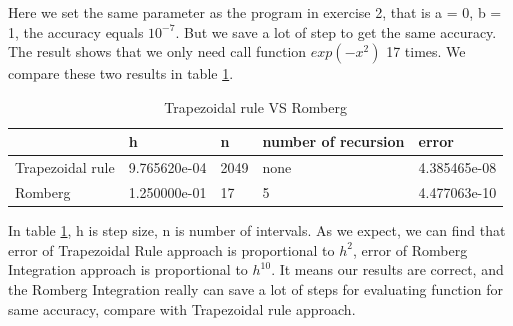 \documentclass{article}
\begin{document}
Here we set the same parameter as the program in exercise 2, that is a = 0, b = 1, the accuracy equals $10^{-7}$. But we save a lot of step to get the same accuracy. The result shows that we only need call function $exp(-x^2)$ 17 times. We compare these two results in table \ref{tab1}.
\begin{table}
\begin{center}
\begin{tabular}{ | l | l | l | l | l | }
\hline
                         &         h             &   n     & number of recursion &       error \\ \hline
Trapezoidal rule & 9.765620e-04 & 2049  & none & 4.385465e-08 \\ \hline
Romberg          & 1.250000e-01 & 17    &  5 & 4.477063e-10 \\ \hline
\end{tabular}
\caption {Trapezoidal rule VS Romberg} \label{tab1}
\end{center}
\end{table}

In table \ref{tab1}, h is step size, n is number of intervals. As we expect, we can find that error of Trapezoidal Rule approach is proportional to $h^2$, error of Romberg Integration approach is proportional to $h^{10}$. It means our results are correct, and the Romberg Integration really can save a lot of steps for evaluating function for same accuracy, compare with Trapezoidal rule approach.
\end{document}
